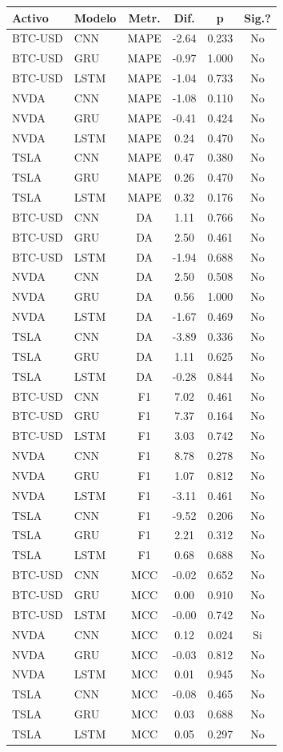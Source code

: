 \begin{tabular}{l|l|c|c|c|c}
\hline
\textbf{Activo} & \textbf{Modelo} & \textbf{Metr.} & \textbf{Dif.} & \textbf{p} & \textbf{Sig.?} \\
\hline
BTC-USD & CNN & MAPE & -2.64 & 0.233 & No \\
BTC-USD & GRU & MAPE & -0.97 & 1.000 & No \\
BTC-USD & LSTM & MAPE & -1.04 & 0.733 & No \\
NVDA & CNN & MAPE & -1.08 & 0.110 & No \\
NVDA & GRU & MAPE & -0.41 & 0.424 & No \\
NVDA & LSTM & MAPE & 0.24 & 0.470 & No \\
TSLA & CNN & MAPE & 0.47 & 0.380 & No \\
TSLA & GRU & MAPE & 0.26 & 0.470 & No \\
TSLA & LSTM & MAPE & 0.32 & 0.176 & No \\
BTC-USD & CNN & DA & 1.11 & 0.766 & No \\
BTC-USD & GRU & DA & 2.50 & 0.461 & No \\
BTC-USD & LSTM & DA & -1.94 & 0.688 & No \\
NVDA & CNN & DA & 2.50 & 0.508 & No \\
NVDA & GRU & DA & 0.56 & 1.000 & No \\
NVDA & LSTM & DA & -1.67 & 0.469 & No \\
TSLA & CNN & DA & -3.89 & 0.336 & No \\
TSLA & GRU & DA & 1.11 & 0.625 & No \\
TSLA & LSTM & DA & -0.28 & 0.844 & No \\
BTC-USD & CNN & F1 & 7.02 & 0.461 & No \\
BTC-USD & GRU & F1 & 7.37 & 0.164 & No \\
BTC-USD & LSTM & F1 & 3.03 & 0.742 & No \\
NVDA & CNN & F1 & 8.78 & 0.278 & No \\
NVDA & GRU & F1 & 1.07 & 0.812 & No \\
NVDA & LSTM & F1 & -3.11 & 0.461 & No \\
TSLA & CNN & F1 & -9.52 & 0.206 & No \\
TSLA & GRU & F1 & 2.21 & 0.312 & No \\
TSLA & LSTM & F1 & 0.68 & 0.688 & No \\
BTC-USD & CNN & MCC & -0.02 & 0.652 & No \\
BTC-USD & GRU & MCC & 0.00 & 0.910 & No \\
BTC-USD & LSTM & MCC & -0.00 & 0.742 & No \\
NVDA & CNN & MCC & 0.12 & 0.024 & Si \\
NVDA & GRU & MCC & -0.03 & 0.812 & No \\
NVDA & LSTM & MCC & 0.01 & 0.945 & No \\
TSLA & CNN & MCC & -0.08 & 0.465 & No \\
TSLA & GRU & MCC & 0.03 & 0.688 & No \\
TSLA & LSTM & MCC & 0.05 & 0.297 & No \\
\hline
\end{tabular}